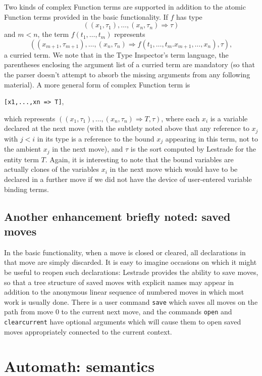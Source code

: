 \documentclass{article}
\begin{document}
Two kinds of complex Function terms are supported in addition to the atomic Function terms provided in the basic functionality.  If $f$ has
type $$((x_1,\tau_1),\ldots,(x_n,\tau_n) \Rightarrow \tau)$$ and $m<n$, the term $f(t_1,\ldots,t_m)$ represents
$$((x_{m+1},\tau_{m+1}),\ldots,(x_n,\tau_n) \Rightarrow f(t_1,\ldots,t_m.x_{m+1},\ldots,x_n),\tau),$$ a curried term.  We note that in the Type Inspector's term language, the parentheses enclosing the argument list of a curried term are mandatory (so that the parser doesn't attempt to absorb the missing arguments from any following material).  A more general form of complex Function term is \begin{center}{\tt [x1,...,xn => T]},\end{center}which represents
$((x_1,\tau_1),\ldots,(x_n,\tau_n) \Rightarrow T,\tau)$, where each $x_i$ is a variable declared at the next move (with the subtlety noted above that
any reference to $x_j$ with $j<i$ in its type is a reference to the bound $x_j$ appearing in this term, not to the ambient $x_j$ in the next move), and $\tau$ is the sort computed by Lestrade for the entity term $T$.  Again, it is interesting to note that the bound variables are actually clones of the variables $x_i$ in the next move which would have to be declared in a further move if we did not have the device of user-entered variable binding terms.

\subsection{Another enhancement briefly noted:  saved moves}

In the basic functionality, when a move is closed or cleared, all declarations in that move are simply discarded.  It is easy to imagine occasions on which it might be useful to reopen such declarations:  Lestrade provides the ability to save moves, so that a tree structure of saved moves with explicit names may appear in addition to the anonymous linear sequence of numbered moves in which most work is usually done.    There is a user command {\tt save} which saves all moves on the path from move 0 to the current next move, and the commands {\tt open} and {\tt clearcurrent} have optional arguments which will cause them to open saved moves appropriately connected to the current context.

\newpage


\section{Automath:  semantics}
\end{document}
